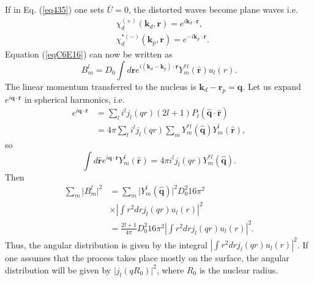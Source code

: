 If in Eq. (\ref{eq435}) one sets $\bar U=0$, the distorted waves become plane waves i.e.
 \begin{subequations}
\begin{align}\label{eq437}
&\chi^{(+)}_d(\mathbf k_d,\mathbf r)=e^{i \mathbf k_d \cdot \mathbf r},\\
&\chi^{*(-)}_d(\mathbf k_p,\mathbf r)=e^{-i \mathbf k_p \cdot \mathbf r}.
\end{align}
\end{subequations}
Equation (\ref{eqC6E16}) can now be written as
\begin{equation}\label{eq438}
B_{m}^l=D_0 \int d\mathbf r e^{i (\mathbf k_d-\mathbf k_p) \cdot \mathbf r} Y_m^{*l}(\hat{\mathbf r}) u_{l}(r).
\end{equation}
The linear momentum transferred to the nucleus is $\mathbf k_d-\mathbf r_p=\mathbf q$.
Let us expand $e^{i \mathbf q \cdot \mathbf r}$ in spherical harmonics, i.e.
\begin{equation}\label{eq439}
\begin{split}
 e^{i \mathbf  q \cdot \mathbf r}&=\sum_l i^l j_l(qr)(2l+1)P_l(\hat {\mathbf q} \cdot \hat {\mathbf r})\\
& =4 \pi \sum_l i^l j_l(qr)\sum_m Y_m^{*l}(\hat {\mathbf q}) Y_m^{l}(\hat {\mathbf r}),
\end{split}
\end{equation}
so
\begin{equation}\label{eq440}
 \int d\hat {\mathbf r} e^{i \mathbf  q \cdot \mathbf r} Y_m^{l}(\hat {\mathbf r})= 4 \pi i^l j_l(qr) Y_m^{*l}(\hat {\mathbf q}).
\end{equation}
Then
\begin{equation}\label{eq441}
\begin{split}
 \sum_{m} \vert B_{m}^l\vert^2 & = \sum_{m} \vert Y_m^{l}(\hat {\mathbf q})\vert^2 D_0^2 16 \pi^2  \\
& \times\left \vert \int r^2 dr j_l(qr) u_l(r) \right \vert ^2\\
& =\frac{2l+1}{4 \pi} D_0^2 16 \pi^2 \left \vert \int r^2 dr j_l(qr) u_l(r) \right \vert ^2.
\end{split}
\end{equation}
Thus, the angular distribution is given by the integral $\left \vert \int r^2 dr j_l(qr) u_l(r) \right \vert ^2$. If one assumes that the process takes place mostly on the surface, the angular distribution will be given by $ \vert j_l(qR_0) \vert ^2$, where $R_0$ is the nuclear radius.

